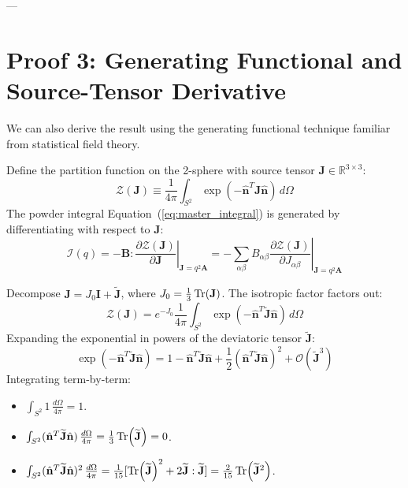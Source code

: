 \documentclass[11pt,a4paper]{article}
\theoremstyle{definition}
\begin{document}
---

\section{Proof 3: Generating Functional and Source-Tensor Derivative}
\label{sec:proof3}

We can also derive the result using the generating functional technique familiar from statistical field theory.

Define the partition function on the 2-sphere with source tensor $\mathbf{J} \in \mathbb{R}^{3 \times 3}$:
\begin{equation}
\mathcal{Z}(\mathbf{J}) \equiv \frac{1}{4\pi} \int_{S^2} \exp\left( -\hat{\mathbf{n}}^T \mathbf{J} \hat{\mathbf{n}} \right) \, d\Omega
\end{equation}
The powder integral Equation~(\ref{eq:master_integral}) is generated by differentiating with respect to $\mathbf{J}$:
\begin{equation}
\mathcal{I}(q) = -\mathbf{B} : \left. \frac{\partial \mathcal{Z}(\mathbf{J})}{\partial \mathbf{J}} \right|_{\mathbf{J} = q^2 \mathbf{A}} = -\sum_{\alpha\beta} B_{\alpha\beta} \left. \frac{\partial \mathcal{Z}(\mathbf{J})}{\partial J_{\alpha\beta}} \right|_{\mathbf{J} = q^2 \mathbf{A}}
\end{equation}

Decompose $\mathbf{J} = J_0 \mathbf{I} + \widetilde{\mathbf{J}}$, where $J_0 = \frac{1}{3}\Tr(\mathbf{J})$. The isotropic factor factors out:
\begin{equation}
\mathcal{Z}(\mathbf{J}) = e^{-J_0} \frac{1}{4\pi} \int_{S^2} \exp\left( -\hat{\mathbf{n}}^T \widetilde{\mathbf{J}} \hat{\mathbf{n}} \right) \, d\Omega
\end{equation}
Expanding the exponential in powers of the deviatoric tensor $\widetilde{\mathbf{J}}$:
\begin{equation}
\exp\left( -\hat{\mathbf{n}}^T \widetilde{\mathbf{J}} \hat{\mathbf{n}} \right) = 1 - \hat{\mathbf{n}}^T \widetilde{\mathbf{J}} \hat{\mathbf{n}} + \frac{1}{2} (\hat{\mathbf{n}}^T \widetilde{\mathbf{J}} \hat{\mathbf{n}})^2 + \mathcal{O}(\widetilde{\mathbf{J}}^3)
\end{equation}
Integrating term-by-term:
\begin{itemize}
    \item $\int_{S^2} 1 \, \frac{d\Omega}{4\pi} = 1$.
    \item $\int_{S^2} (\hat{\mathbf{n}}^T \widetilde{\mathbf{J}} \hat{\mathbf{n}}) \, \frac{d\Omega}{4\pi} = \frac{1}{3}\Tr(\widetilde{\mathbf{J}}) = 0$.
    \item $\int_{S^2} (\hat{\mathbf{n}}^T \widetilde{\mathbf{J}} \hat{\mathbf{n}})^2 \, \frac{d\Omega}{4\pi} = \frac{1}{15} [\Tr(\widetilde{\mathbf{J}})^2 + 2 \widetilde{\mathbf{J}}:\widetilde{\mathbf{J}}] = \frac{2}{15} \Tr(\widetilde{\mathbf{J}}^2)$.
\end{itemize}
\end{document}
